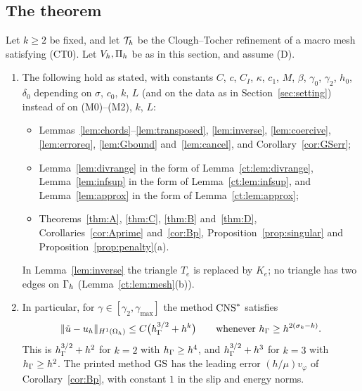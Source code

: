 \subsection{The theorem}

\begin{theorem}\label{ct:thm:main}
Let $k\ge2$ be fixed, and let $\mathcal T_h$ be the Clough--Tocher refinement of a macro mesh satisfying (CT0). Let $V_h,\Pi_h$ be as in this section, and assume (D).
\begin{enumerate}[label=(\roman*)]
\item The following hold as stated, with constants $C$, $c$, $C_I$, $\kappa$, $c_1$, $M$, $\beta$, $\gamma_0$, $\gamma_2$, $h_0$, $\delta_0$ depending on $\sigma$, $c_0$, $k$, $L$ (and on the data as in Section~\ref{sec:setting}) instead of on (M0)--(M2), $k$, $L$:
\begin{itemize}
\item Lemmas~\ref{lem:chords}--\ref{lem:transposed}, \ref{lem:inverse}, \ref{lem:coercive}, \ref{lem:erroreq}, \ref{lem:Gbound} and~\ref{lem:cancel}, and Corollary~\ref{cor:GSerr};
\item Lemma~\ref{lem:divrange} in the form of Lemma~\ref{ct:lem:divrange}, Lemma~\ref{lem:infsup} in the form of Lemma~\ref{ct:lem:infsup}, and Lemma~\ref{lem:approx} in the form of Lemma~\ref{ct:lem:approx};
\item Theorems~\ref{thm:A}, \ref{thm:C}, \ref{thm:B} and~\ref{thm:D}, Corollaries~\ref{cor:Aprime} and~\ref{cor:Bp}, Proposition~\ref{prop:singular} and Proposition~\ref{prop:penalty}(a).
\end{itemize}
In Lemma~\ref{lem:inverse} the triangle $T_e$ is replaced by $K_e$; no triangle has two edges on $\Gamma_h$ (Lemma~\ref{ct:lem:mesh}(b)).
\item In particular, for $\gamma\in[\gamma_2,\gamma_{\max}]$ the method $\mathrm{CNS}^\ast$ satisfies
\[
\lVert \tilde u-u_h\rVert_{H^1(\Omega_h)}\le C\bigl(h_\Gamma^{3/2}+h^k\bigr)\qquad\text{whenever }h_\Gamma\ge h^{2(\sigma_k-k)} .
\]
This is $h_\Gamma^{3/2}+h^2$ for $k=2$ with $h_\Gamma\ge h^4$, and $h_\Gamma^{3/2}+h^3$ for $k=3$ with $h_\Gamma\ge h^2$. The printed method $\mathrm{GS}$ has the leading error $(h/\mu)v_\varphi$ of Corollary~\ref{cor:Bp}, with constant $1$ in the slip and energy norms.
\end{enumerate}
\end{theorem}

